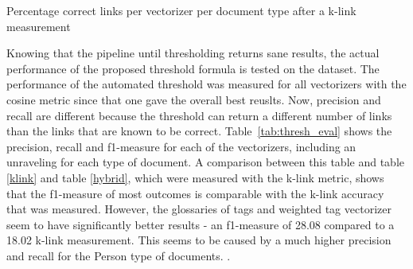 \begin{table}
\caption{Percentage correct links per vectorizer per document type after a k-link measurement}
\label{tab:thresh_eval}
\end{table}

Knowing that the pipeline until thresholding returns sane results, the actual performance
of the proposed threshold formula is tested on the dataset. The performance of the 
automated threshold was measured for all vectorizers with the cosine metric since that one gave the overall best reuslts. Now, precision and recall are different because the threshold can 
return a different number of links than the links that are known to be correct. Table~\ref{tab:thresh_eval} 
shows the precision, recall and f1-measure for each of the vectorizers, including an unraveling for
each type of document. A comparison between this table and table \ref{klink} and table \ref{hybrid}, which were measured with the k-link metric, shows that the f1-measure of most outcomes is comparable with the k-link accuracy that was measured. However, the glossaries of tags and weighted tag vectorizer seem to have significantly better results - an f1-measure of 28.08 compared to a 18.02 k-link measurement. This seems to be caused by a much higher precision and recall for the Person type of documents. . 
